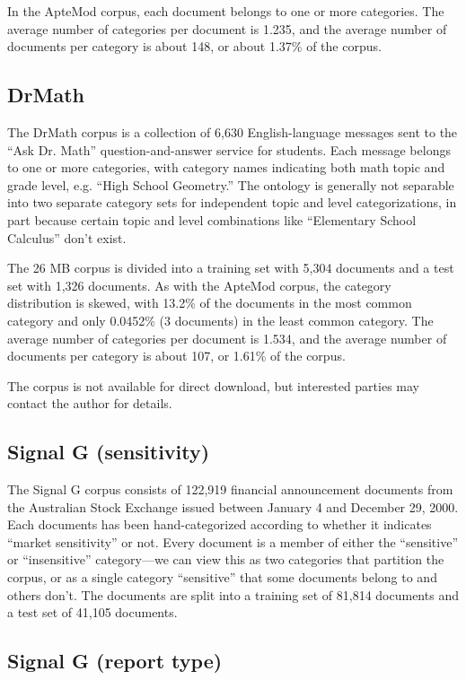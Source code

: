 In the ApteMod corpus, each document belongs to one or more
categories.  The average number of categories per document is 1.235,
and the average number of documents per category is about 148, or
about 1.37\% of the corpus.

\subsection{DrMath}

The DrMath corpus is a collection of 6,630 English-language messages
sent to the ``Ask Dr. Math'' question-and-answer service for
students.\cite{drmath} Each message belongs to one or more categories,
with category names indicating both math topic and grade level,
e.g. ``High School Geometry.''  The ontology is generally not
separable into two separate category sets for independent topic and
level categorizations, in part because certain topic and level
combinations like ``Elementary School Calculus'' don't exist.

The 26 MB corpus is divided into a training set with 5,304 documents
and a test set with 1,326 documents.  As with the ApteMod corpus, the
category distribution is skewed, with 13.2\% of the documents in the
most common category and only 0.0452\% (3 documents) in the least
common category.  The average number of categories per document is
1.534, and the average number of documents per category is about 107,
or 1.61\% of the corpus.

The corpus is not available for direct download, but interested
parties may contact the author for details.


\subsection{Signal G (sensitivity)}

The Signal G corpus consists of 122,919 financial announcement documents from
the Australian Stock Exchange issued between January 4 and December 29, 2000.
Each documents has been hand-categorized according to whether it indicates
``market sensitivity'' or not.  Every document is a member of either the
``sensitive'' or ``insensitive'' category---we can view this as two
categories that partition the corpus, or as a single category
``sensitive'' that some documents belong to and others don't.  The
documents are split into a training set of 81,814 documents and a test
set of 41,105 documents.

\subsection{Signal G (report type)}

